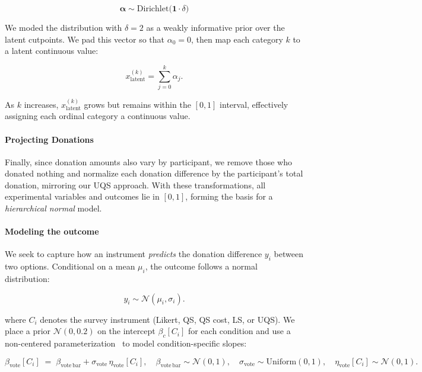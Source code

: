 \begin{equation}
    \boldsymbol{\alpha} \sim \mathrm{Dirichlet}\bigl(\mathbf{1}\cdot \delta\bigr)
\end{equation}

We moded the distribution with $\delta=2$ as a weakly informative prior over the latent cutpoints. We pad this vector so that $\alpha_0 = 0$, then map each category $k$ to a latent continuous value:

\begin{equation}
    x_{\mathrm{latent}}^{(k)} = \sum_{j=0}^{k} \alpha_j.
\end{equation}

As $k$ increases, $x_{\mathrm{latent}}^{(k)}$ grows but remains within the $[0,1]$ interval, effectively assigning each ordinal category a continuous value. 

\paragraph{Projecting Donations} Finally, since donation amounts also vary by participant, we remove those who donated nothing and normalize each donation difference by the participant's total donation, mirroring our UQS approach. With these transformations, all experimental variables and outcomes lie in $[0,1]$, forming the basis for a \emph{hierarchical normal} model.

\paragraph{Modeling the outcome}
We seek to capture how an instrument \emph{predicts} the donation difference $y_i$ between two options. Conditional on a mean $\mu_i$, the outcome follows a normal distribution:

\begin{equation}
    \label{eq:intensity_normal}
    y_i \sim \mathcal{N}(\mu_i, \sigma_i).
\end{equation}

where $C_i$ denotes the survey instrument (Likert, QS, QS cost, LS, or UQS). We place a prior $\mathcal{N}(0,0.2)$ on the intercept $\beta_{c}[C_i]$ for each condition and use a non-centered parameterization~\cite{mcelreath2018statistical} to model condition-specific slopes:

\begin{equation}
    \beta_{\text{vote}}[C_i]
    \;=\;
    \beta_{\text{vote}\,\text{bar}}
    + \sigma_{\text{vote}}\,\eta_{\text{vote}}[C_i],
    \quad
    \beta_{\text{vote}\,\text{bar}}
    \sim
    \mathcal{N}(0,1),
    \quad
    \sigma_{\text{vote}}
    \sim
    \mathrm{Uniform}(0,1),
    \quad
    \eta_{\text{vote}}[C_i]
    \sim
    \mathcal{N}(0,1).
\end{equation}

